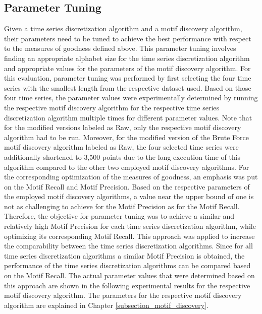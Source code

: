 \subsection*{Parameter Tuning}
Given a time series discretization algorithm and a motif discovery algorithm, their parameters need to be tuned to achieve the best performance with respect to the measures of goodness defined above. This parameter tuning involves finding an appropriate alphabet size for the time series discretization algorithm and appropriate values for the parameters of the motif discovery algorithm. \newline
For this evaluation, parameter tuning was performed by first selecting the four time series with the smallest length from the respective dataset used. Based on those four time series, the parameter values were experimentally determined by running the respective motif discovery algorithm for the respective time series discretization algorithm multiple times for different parameter values. Note that for the modified versions labeled as Raw, only the respective motif discovery algorithm had to be run. Moreover, for the modified version of the Brute Force motif discovery algorithm labeled as Raw, the four selected time series were additionally shortened to 3,500 points due to the long execution time of this algorithm compared to the other two employed motif discovery algorithms. \newline
For the corresponding optimization of the measures of goodness, an emphasis was put on the Motif Recall and Motif Precision. Based on the respective parameters of the employed motif discovery algorithms, a value near the upper bound of one is not as challenging to achieve for the Motif Precision as for the Motif Recall. Therefore, the objective for parameter tuning was to achieve a similar and relatively high Motif Precision for each time series discretization algorithm, while optimizing its corresponding Motif Recall. This approach was applied to increase the comparability between the time series discretization algorithms. Since for all time series discretization algorithms a similar Motif Precision is obtained, the performance of the time series discretization algorithms can be compared based on the Motif Recall. The actual parameter values that were determined based on this approach are shown in the following experimental results for the respective motif discovery algorithm. The parameters for the respective motif discovery algorithm are explained in Chapter \ref{subsection_motif_discovery}. \newline
